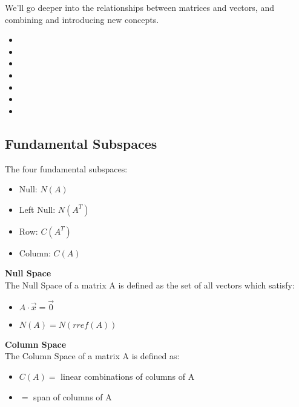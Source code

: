 
We'll go deeper into the relationships between matrices and vectors, and combining and introducing new concepts.

\begin{itemize}
	\item {}
	\item {}
	\item {}
	\item {}
	\item {}
	\item {}
	\item {}
\end{itemize}


\subsection{Fundamental Subspaces}\label{concept3.1}
The four fundamental subspaces:
\begin{itemize}
	\item Null: $N(A)$
	\item Left Null: $N(A^T)$
	\item Row: $C(A^T)$
	\item Column: $C(A)$
\end{itemize}

\textbf{Null Space}
\\

The Null Space of a matrix A is defined as the set of all vectors which satisfy:
\begin{itemize}
	\item $A \cdot \vec{x} = \vec{0}$
	\item $N(A) = N(rref(A))$
\end{itemize}

\textbf{Column Space}
\\

The Column Space of a matrix A is defined as:
\begin{itemize}
	\item $C(A) =$ linear combinations of columns of A
	\item $=$ span of columns of A
\end{itemize}

